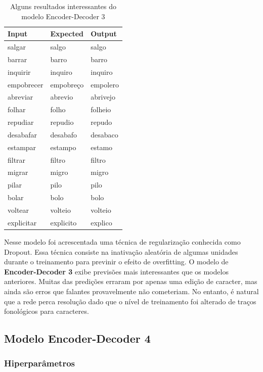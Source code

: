 \begin{table}[H]
\centering
\begin{tabular}{lll}
\textbf{Input} & \textbf{Expected} & \textbf{Output} \\ \hline
salgar& salgo& salgo\\
barrar& barro& barro\\
inquirir& inquiro& inquiro\\
empobrecer& empobreço& empolero\\
abreviar& abrevio& abrivejo\\
folhar& folho& folheio\\
repudiar& repudio& repudo\\
desabafar& desabafo& desabaco\\
estampar& estampo& estamo\\
filtrar& filtro& filtro\\
migrar& migro& migro\\
pilar& pilo& pilo\\
bolar& bolo& bolo\\
voltear& volteio& volteio\\
explicitar& explicito& explico
\end{tabular}
\caption{Alguns resultados interessantes do modelo Encoder-Decoder 3}
\label{tab:res3}
\end{table}

Nesse modelo foi acrescentada uma técnica de regularização conhecida como Dropout. Essa técnica consiste na inativação aleatória de algumas unidades durante o treinamento para previnir o efeito de overfitting. O modelo de \textbf{Encoder-Decoder 3} exibe previsões mais interessantes que os modelos anteriores. Muitas das predições erraram por apenas uma edição de caracter, mas ainda são erros que falantes provavelmente não cometeriam. No entanto, é natural que a rede perca resolução dado que o nível de treinamento foi alterado de traços fonológicos para caracteres.

\subsection{Modelo Encoder-Decoder 4}

\subsubsection{Hiperparâmetros} 

